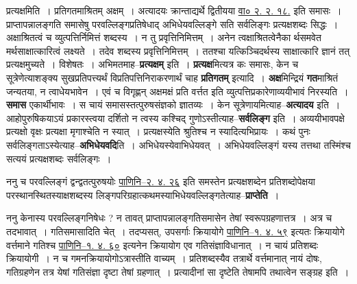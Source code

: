 \documentclass[article,12pt,a4paper]{memoir}
\begin{document}
	प्रत्यक्षमिति । प्रतिगतमाश्रितम् अक्षम् । अत्यादयः क्रान्ताद्यर्थे द्वितीयया  \href{http://sarit.indology.info/?cref=htu.90}{वा० २. २. १८.} इति समासः । प्राप्तापन्नालङ्गति समासेषु परवल्लिङ्गप्रतिषेधाद् अभिधेयवल्लिङ्गे सति सर्वलिङ्गः प्रत्यक्षशब्दः सिद्धः । अक्षाश्रितत्वं च व्युत्पत्तिर्निमित्तं शब्दस्य । न तु प्रवृत्तिनिमित्तम् । अनेन त्वक्षाश्रितत्वेनैका र्थसमवेत मर्थसाक्षात्कारित्वं लक्ष्यते । तदेव शब्दस्य प्रवृत्तिनिमित्तम् । ततश्चा यत्किञ्चिदर्थस्य साक्षात्कारि ज्ञानं तत् प्रत्यक्षमुच्यते । विशेषतः । अभिमतमाह--\textbf{प्रत्यक्षम्} इति । \textbf{प्रत्यक्ष}मित्यत्र कः समासः, केन च सूत्रेणेत्याशङ्क्य सुखप्रतिपत्त्यर्थं विप्रतिपत्तिनिराकरणार्थं चाह \textbf{प्रतिगतम्} इत्यादि । \textbf{अक्ष}मिन्द्रियं \textbf{गत}माश्रितं जन्यतया, न त्वाधेयभावेन । एवं च विगृह्णन् अक्षमक्षं प्रति वर्त्तत इति व्युत्पत्तिप्रकारेणाव्ययीभावं निरस्यति । \textbf{समास} एकार्थीभावः । स चायं समासस्तत्पुरुषसंज्ञको ज्ञातव्यः । केन सूत्रेणायमित्याह--\textbf{अत्यादय} इति । आहोपुरुषिकयाऽयं प्रकारस्त्वया दर्शितो न त्वस्य कश्चिद् गुणोऽस्तीत्याह--\textbf{सर्वलिङ्ग} इति । अव्ययीभावपक्षे प्रत्यक्षो वृक्षः प्रत्यक्षा मृगाश्चेति न स्यात् । प्रत्यक्षस्येति श्रुतिश्च न स्यादित्यभिप्रायः । कथं पुनः सर्वलिङ्गताऽस्येत्याह--\textbf{अभिधेयवदि}ति । अभिधेयस्येवाभिधेयवत् । अभिधेयवल्लिङ्गं यस्य तत्तथा तस्मिंश्च सत्ययं प्रत्यक्षशब्दः सर्वलिङ्गः ।
	\pend
      

	  \pstart ननु च परवल्लिङ्गं द्वन्द्वतत्पुरुषयोः \href{http://sarit.indology.info/?cref=Pā.2.4.26}{पाणिनि--२. ४. २६} इति समस्तेन प्रत्यक्षशब्देन प्रतिशब्दोपेक्षया परस्थानस्थितस्याक्षशब्दस्य लिङ्गपरिग्रहात्कथमस्याभिधेयवल्लिङ्गतेत्याह--\textbf{प्राप्तेति} ।
	\pend
      

	  \pstart ननु केनास्य परवल्लिङ्गनिषेधः ? न तावत् प्राप्तापन्नालङ्गतिसमासेन तेषां स्वरूपग्रहणात्तत्र । अत्र च तदभावात् । गतिसमासादिति चेत् । तदप्यसत्, उपसर्गाः क्रियायोगे  \href{http://sarit.indology.info/?cref=Pā.1.4.59}{पाणिनि--१. ४. ५९} इत्यतः क्रियायोगे वर्त्तमाने गतिश्च \href{http://sarit.indology.info/?cref=Pā.1.4.60}{पाणिनि--१. ४. ६०} इत्यनेन क्रियायोग एव गतिसंज्ञाविधानात् । न चायं प्रतिशब्दः क्रियायोगी । न च गमनक्रियायोगोऽत्रास्तीति वाच्यम् । प्रतिशब्दस्यैव तत्रार्थे वर्त्तमानात् नायं दोषः, गतिग्रहणेन तत्र येषां गतिसंज्ञा दृष्टा तेषां ग्रहणात् । प्रत्यादीनां सा दृष्टेति तेषामपि तथात्वेन सङ्ग्रह इति ।
	\pend
      
\end{document}
